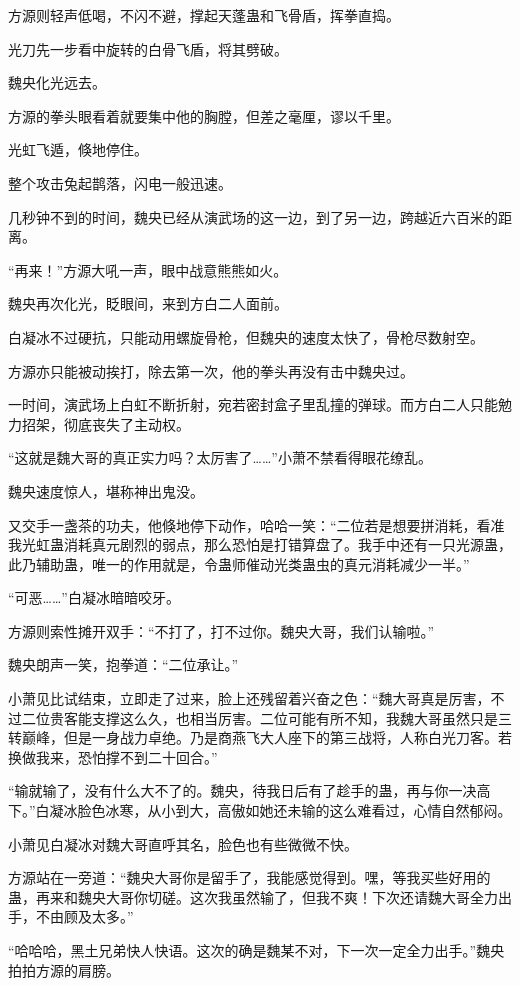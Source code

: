 \begin{this_body}
方源则轻声低喝，不闪不避，撑起天蓬蛊和飞骨盾，挥拳直捣。

光刀先一步看中旋转的白骨飞盾，将其劈破。

魏央化光远去。

方源的拳头眼看着就要集中他的胸膛，但差之毫厘，谬以千里。

光虹飞遁，倏地停住。

整个攻击兔起鹊落，闪电一般迅速。

几秒钟不到的时间，魏央已经从演武场的这一边，到了另一边，跨越近六百米的距离。

“再来！”方源大吼一声，眼中战意熊熊如火。

魏央再次化光，眨眼间，来到方白二人面前。

白凝冰不过硬抗，只能动用螺旋骨枪，但魏央的速度太快了，骨枪尽数射空。

方源亦只能被动挨打，除去第一次，他的拳头再没有击中魏央过。

一时间，演武场上白虹不断折射，宛若密封盒子里乱撞的弹球。而方白二人只能勉力招架，彻底丧失了主动权。

“这就是魏大哥的真正实力吗？太厉害了……”小萧不禁看得眼花缭乱。

魏央速度惊人，堪称神出鬼没。

又交手一盏茶的功夫，他倏地停下动作，哈哈一笑：“二位若是想要拼消耗，看准我光虹蛊消耗真元剧烈的弱点，那么恐怕是打错算盘了。我手中还有一只光源蛊，此乃辅助蛊，唯一的作用就是，令蛊师催动光类蛊虫的真元消耗减少一半。”

“可恶……”白凝冰暗暗咬牙。

方源则索性摊开双手：“不打了，打不过你。魏央大哥，我们认输啦。”

魏央朗声一笑，抱拳道：“二位承让。”

小萧见比试结束，立即走了过来，脸上还残留着兴奋之色：“魏大哥真是厉害，不过二位贵客能支撑这么久，也相当厉害。二位可能有所不知，我魏大哥虽然只是三转巅峰，但是一身战力卓绝。乃是商燕飞大人座下的第三战将，人称白光刀客。若换做我来，恐怕撑不到二十回合。”

“输就输了，没有什么大不了的。魏央，待我日后有了趁手的蛊，再与你一决高下。”白凝冰脸色冰寒，从小到大，高傲如她还未输的这么难看过，心情自然郁闷。

小萧见白凝冰对魏大哥直呼其名，脸色也有些微微不快。

方源站在一旁道：“魏央大哥你是留手了，我能感觉得到。嘿，等我买些好用的蛊，再来和魏央大哥你切磋。这次我虽然输了，但我不爽！下次还请魏大哥全力出手，不由顾及太多。”

“哈哈哈，黑土兄弟快人快语。这次的确是魏某不对，下一次一定全力出手。”魏央拍拍方源的肩膀。


\end{this_body}
